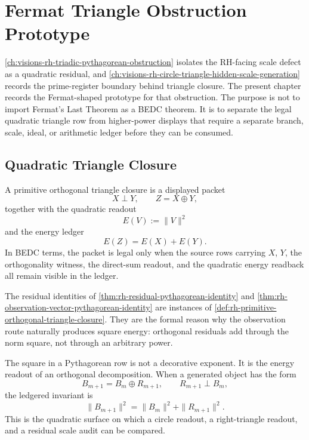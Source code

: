 \chapter{Fermat Triangle Obstruction Prototype}
\label{ch:visions-rh-fermat-triangle-obstruction-prototype}

\autoref{ch:visions-rh-triadic-pythagorean-obstruction} isolates the
RH-facing scale defect as a quadratic residual, and
\autoref{ch:visions-rh-circle-triangle-hidden-scale-generation} records the
prime-register boundary behind triangle closure.  The present chapter records
the Fermat-shaped prototype for that obstruction.  The purpose is not to
import Fermat's Last Theorem as a BEDC theorem.  It is to separate the legal
quadratic triangle row from higher-power displays that require a separate
branch, scale, ideal, or arithmetic ledger before they can be consumed.

\section{Quadratic Triangle Closure}
\label{sec:rh-fermat-prototype-quadratic-triangle-closure}

\begin{definition}
\label{def:rh-primitive-orthogonal-triangle-closure}
A primitive orthogonal triangle closure is a displayed packet
$$
X\perp Y,
\qquad
Z=X\oplus Y,
$$
together with the quadratic readout
$$
E(V):=\|V\|^2
$$
and the energy ledger
$$
E(Z)=E(X)+E(Y).
$$
In BEDC terms, the packet is legal only when the source rows carrying
$X$, $Y$, the orthogonality witness, the direct-sum readout, and the
quadratic energy readback all remain visible in the ledger.
\end{definition}

The residual identities of
\autoref{thm:rh-residual-pythagorean-identity} and
\autoref{thm:rh-observation-vector-pythagorean-identity} are instances of
\autoref{def:rh-primitive-orthogonal-triangle-closure}.  They are the formal
reason why the observation route naturally produces square energy:
orthogonal residuals add through the norm square, not through an arbitrary
power.

\begin{principle}
\label{prin:rh-square-energy-orthogonal-information-readout}
The square in a Pythagorean row is not a decorative exponent.  It is the
energy readout of an orthogonal decomposition.  When a generated object has
the form
$$
B_{m+1}=B_m\oplus R_{m+1},
\qquad
R_{m+1}\perp B_m,
$$
the ledgered invariant is
$$
\|B_{m+1}\|^2
=
\|B_m\|^2+\|R_{m+1}\|^2.
$$
This is the quadratic surface on which a circle readout, a right-triangle
readout, and a residual scale audit can be compared.
\end{principle}

